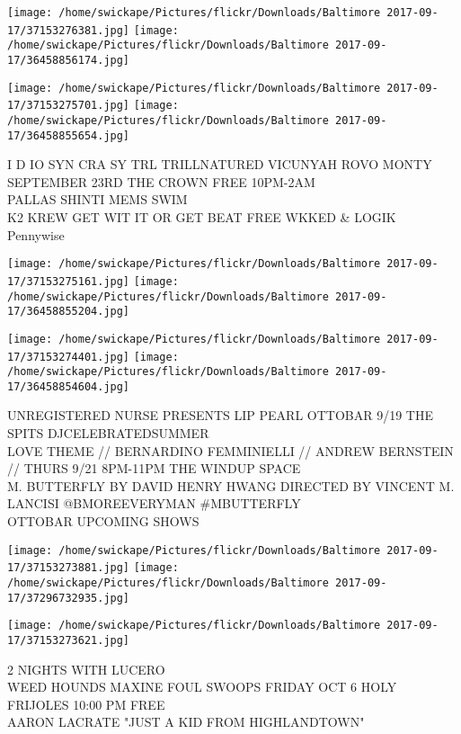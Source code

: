 \documentclass[10pt,letterpaper]{article}
\begin{document}
\texttt{[image: /home/swickape/Pictures/flickr/Downloads/Baltimore 2017-09-17/37153276381.jpg]}
\texttt{[image: /home/swickape/Pictures/flickr/Downloads/Baltimore 2017-09-17/36458856174.jpg]}

\texttt{[image: /home/swickape/Pictures/flickr/Downloads/Baltimore 2017-09-17/37153275701.jpg]}
\texttt{[image: /home/swickape/Pictures/flickr/Downloads/Baltimore 2017-09-17/36458855654.jpg]}

I D IO SYN CRA SY TRL TRILLNATURED VICUNYAH ROVO MONTY SEPTEMBER 23RD THE CROWN FREE 10PM{-}2AM\\
PALLAS SHINTI MEMS SWIM\\
K2 KREW GET WIT IT OR GET BEAT FREE WKKED \& LOGIK\\
Pennywise\\
\pagebreak

\texttt{[image: /home/swickape/Pictures/flickr/Downloads/Baltimore 2017-09-17/37153275161.jpg]}
\texttt{[image: /home/swickape/Pictures/flickr/Downloads/Baltimore 2017-09-17/36458855204.jpg]}

\texttt{[image: /home/swickape/Pictures/flickr/Downloads/Baltimore 2017-09-17/37153274401.jpg]}
\texttt{[image: /home/swickape/Pictures/flickr/Downloads/Baltimore 2017-09-17/36458854604.jpg]}

UNREGISTERED NURSE PRESENTS LIP PEARL OTTOBAR 9/19 THE SPITS DJCELEBRATEDSUMMER\\
LOVE THEME // BERNARDINO FEMMINIELLI // ANDREW BERNSTEIN // THURS 9/21 8PM{-}11PM THE WINDUP SPACE\\
M. BUTTERFLY BY DAVID HENRY HWANG DIRECTED BY VINCENT M. LANCISI @BMOREEVERYMAN \#MBUTTERFLY\\
OTTOBAR UPCOMING SHOWS\\
\pagebreak

\texttt{[image: /home/swickape/Pictures/flickr/Downloads/Baltimore 2017-09-17/37153273881.jpg]}
\texttt{[image: /home/swickape/Pictures/flickr/Downloads/Baltimore 2017-09-17/37296732935.jpg]}

\vspace{0.25in}
\texttt{[image: /home/swickape/Pictures/flickr/Downloads/Baltimore 2017-09-17/37153273621.jpg]}

2 NIGHTS WITH LUCERO\\
WEED HOUNDS MAXINE FOUL SWOOPS FRIDAY OCT 6 HOLY FRIJOLES 10:00 PM FREE\\
AARON LACRATE "JUST A KID FROM HIGHLANDTOWN"\\
\pagebreak
\end{document}
